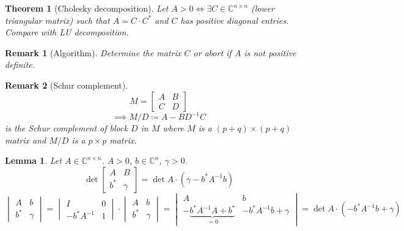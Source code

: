\documentclass[a4paper]{article}
\newcounter{lecref}[section]
\numberwithin{lecref}{section}
\newtheorem{theorem}[lecref]{Theorem}
\newtheorem{lemma}[lecref]{Lemma}
\newtheorem*{Remark}{Remark}
\begin{document}
\begin{theorem}[Cholesky decomposition] %
  Let $A > 0 \iff \exists C \in \mathbb C^{n \times n}$ (lower triangular matrix) such that $A = C \cdot C^*$ and $C$ has positive diagonal entries.
  Compare with LU decomposition.
\end{theorem}

\begin{Remark}[Algorithm]
  Determine the matrix $C$ or abort if $A$ is not positive definite.
\end{Remark}

\begin{Remark}[Schur complement]
  \[ M = \begin{bmatrix} A & B \\ C & D \end{bmatrix} \]
  \[ \implies M/D \coloneqq A - BD^{-1} C \]
  is the Schur complement of block $D$ in $M$ where $M$ is a $(p + q) \times (p + q)$ matrix and $M/D$ is a $p\times p$ matrix.
\end{Remark}

\begin{lemma} %
  Let $A \in \mathbb C^{n \times n}$. $A > 0$, $b \in \mathbb C^n$, $\gamma > 0$.
  \[ \det\left[\begin{array}{c|c}A & B \\ \hline b^* & \gamma \end{array}\right] = \det A \cdot (\gamma - b^* A^{-1} b)  \]
  \[
    \begin{vmatrix} A & b \\ b^* & \gamma \end{vmatrix}
    = \begin{vmatrix} I & 0 \\ -b^* A^{-1} & 1 \end{vmatrix} \cdot \begin{vmatrix} A & b \\ b^* & \gamma \end{vmatrix}
    = \begin{vmatrix} A & b \\ -\underbrace{b^* A^{-1} A + b^*}_{=0} & -b^* A^{-1} b + \gamma \end{vmatrix}
    = \det{A} \cdot (-b^* A^{-1} b + \gamma)
  \]
\end{lemma}
\end{document}
